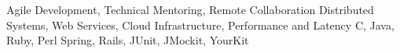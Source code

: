 
\begin{cvskills}
   {Agile Development, Technical Mentoring, Remote Collaboration}
   {Distributed Systems, Web Services, Cloud Infrastructure, Performance and Latency}
   {C, Java, Ruby, Perl}
   {Spring, Rails, JUnit, JMockit, YourKit}

\end{cvskills}
